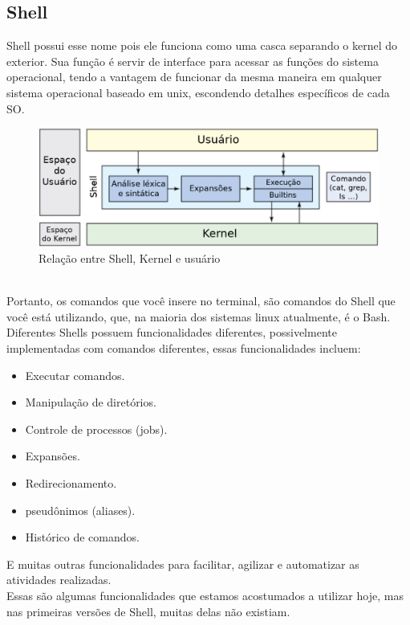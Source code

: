 	\subsection{Shell}
	Shell possui esse nome pois ele funciona como uma casca separando o kernel do exterior. Sua função é servir de interface para acessar as funções do sistema operacional, tendo a vantagem de funcionar da mesma maneira em qualquer sistema operacional baseado em unix, escondendo detalhes específicos de cada SO.
	\begin{figure}[h]
		\includegraphics[width=\linewidth]{shell_struct1.png}
		\caption{Relação entre Shell, Kernel e usuário}
		\label{fig:shellstruct}
	\end{figure}\\
	Portanto, os comandos que você insere no terminal, são comandos do Shell que você está utilizando, que, na maioria dos sistemas linux atualmente, é o Bash. Diferentes Shells possuem funcionalidades diferentes, possivelmente implementadas com comandos diferentes, essas funcionalidades incluem:
	\begin{itemize}
		\item Executar comandos.
		\item Manipulação de diretórios.
		\item Controle de processos (jobs).
		\item Expansões.
		\item Redirecionamento.
		\item pseudônimos (aliases).
		\item Histórico de comandos.
	\end{itemize}
	E muitas outras funcionalidades para facilitar, agilizar e automatizar as atividades realizadas.\\
	Essas são algumas funcionalidades que estamos acostumados a utilizar hoje, mas nas primeiras versões de Shell, muitas delas não existiam.
	
